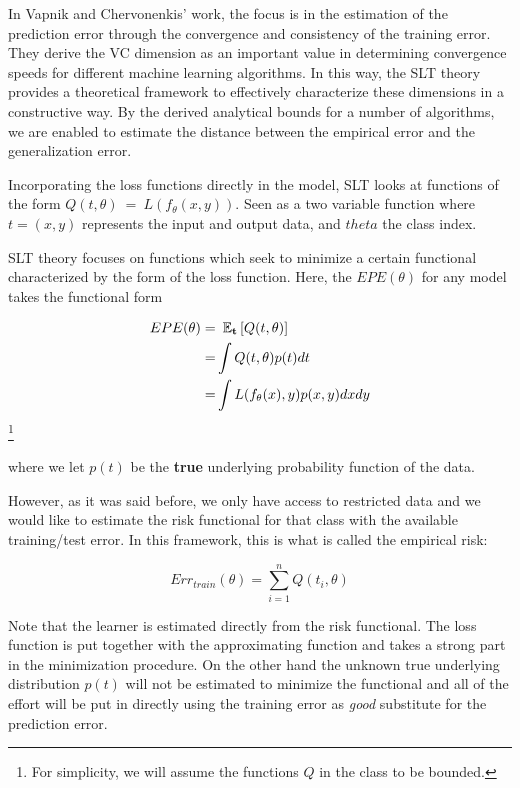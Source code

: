In Vapnik and Chervonenkis' work, the focus is in the estimation of the prediction error through the convergence and consistency of the training error. They derive the VC dimension as an important value in determining convergence speeds for different machine learning algorithms. In this way, the SLT theory provides a theoretical framework to effectively characterize these dimensions in a constructive way. By the derived analytical bounds for a number of algorithms, we are enabled to estimate the distance between the empirical error and the generalization error.

Incorporating the loss functions directly in the model, SLT looks at functions of the form $Q(t,\theta) \ = \ L(f_\theta(x,y))$. Seen as a two variable function where $t=(x,y)$ represents the input and output data, and $theta$ the class index.

SLT theory focuses on functions which seek to minimize a certain functional characterized by the form of the loss function. Here, the $EPE(\theta)$ for any model takes the functional form

\begin{equation}\label{vapnik-risk}
\begin{split}
EPE(\theta) = & \ \operatorname{\mathbb{E}}_{\textbf{t}} \left[  Q(t,\theta) \right]\\
= & \int Q(t,\theta) p(t) dt  \\
= & \int L(f_\theta(x),y) p(x,y) dx dy
\end{split}
\end{equation}\footnote{For simplicity, we will assume the functions $Q$ in the class to be bounded.}

where we let $p(t)$ be the \textbf{true} underlying probability function of the data.

However, as it was said before, we only have access to restricted data and we would like to estimate the risk functional for that class with the available training/test error. In this framework, this is what is called the empirical risk:

\begin{equation}\label{vapnik-empiricalRisk}
Err_{train}(\theta) =  \sum_{i=1}^n Q(t_i,\theta)
\end{equation}

Note that the learner is estimated directly from the risk functional. The loss function is put together with the approximating function and takes a strong part in the minimization procedure. On the other hand the unknown true underlying distribution $p(t)$ will not be estimated to minimize the functional and all of the effort will be put in directly using the training error as \textit{good} substitute for the prediction error.


